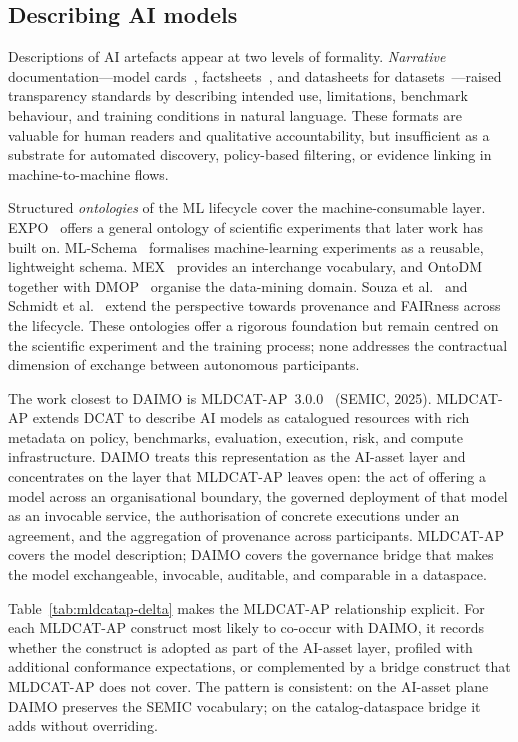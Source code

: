 \documentclass[Afour,sagev,times]{sagej}
\begin{document}
\subsection{Describing AI models}

Descriptions of AI artefacts appear at two levels of formality. \emph{Narrative} documentation---model cards~\cite{mitchell19}, factsheets~\cite{arnold19}, and datasheets for datasets~\cite{gebru21}---raised transparency standards by describing intended use, limitations, benchmark behaviour, and training conditions in natural language. These formats are valuable for human readers and qualitative accountability, but insufficient as a substrate for automated discovery, policy-based filtering, or evidence linking in machine-to-machine flows.

Structured \emph{ontologies} of the ML lifecycle cover the machine-consumable layer. EXPO~\cite{expo} offers a general ontology of scientific experiments that later work has built on. ML-Schema~\cite{mls} formalises machine-learning experiments as a reusable, lightweight schema. MEX~\cite{mex} provides an interchange vocabulary, and OntoDM~\cite{ontodm} together with DMOP~\cite{dmop} organise the data-mining domain. Souza et al.~\cite{souza19} and Schmidt et al.~\cite{schmidt21} extend the perspective towards provenance and FAIRness across the lifecycle. These ontologies offer a rigorous foundation but remain centred on the scientific experiment and the training process; none addresses the contractual dimension of exchange between autonomous participants.

The work closest to DAIMO is MLDCAT-AP~3.0.0~\cite{mldcatap} (SEMIC, 2025). MLDCAT-AP extends DCAT to describe AI models as catalogued resources with rich metadata on policy, benchmarks, evaluation, execution, risk, and compute infrastructure. DAIMO treats this representation as the AI-asset layer and concentrates on the layer that MLDCAT-AP leaves open: the act of offering a model across an organisational boundary, the governed deployment of that model as an invocable service, the authorisation of concrete executions under an agreement, and the aggregation of provenance across participants. MLDCAT-AP covers the model description; DAIMO covers the governance bridge that makes the model exchangeable, invocable, auditable, and comparable in a dataspace.

Table~\ref{tab:mldcatap-delta} makes the MLDCAT-AP relationship explicit. For each MLDCAT-AP construct most likely to co-occur with DAIMO, it records whether the construct is adopted as part of the AI-asset layer, profiled with additional conformance expectations, or complemented by a bridge construct that MLDCAT-AP does not cover. The pattern is consistent: on the AI-asset plane DAIMO preserves the SEMIC vocabulary; on the catalog-dataspace bridge it adds without overriding.
\end{document}
